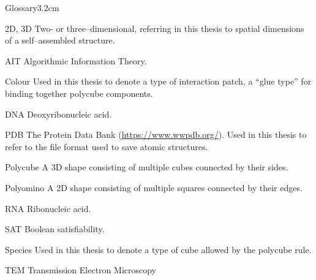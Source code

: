 \begin{mclistof}{Glossary}{3.2cm}

\item[2D, 3D] Two- or three--dimensional, referring in this thesis to spatial dimensions of a self--assembled structure.
\item[AIT] Algorithmic Information Theory.
\item[Colour] Used in this thesis to denote a type of interaction patch, a ``glue type'' for binding together polycube components.
\item[DNA] Deoxyribonucleic acid.
\item[PDB] The Protein Data Bank (\url{https://www.wwpdb.org/}). Used in this thesis to refer to the file format used to save atomic structures.
\item[Polycube] A 3D shape consisting of multiple cubes connected by their sides.
\item[Polyomino] A 2D shape consisting of multiple squares connected by their edges.
\item[RNA] Ribonucleic acid.
\item[SAT] Boolean satisfiability.
\item[Species] Used in this thesis to denote a type of cube allowed by the polycube rule.
\item[TEM] Transmission Electron Microscopy 

\end{mclistof} 
